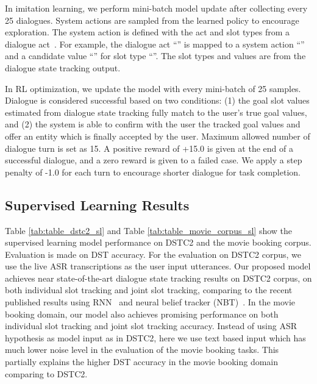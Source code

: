 \documentclass[11pt,a4paper]{article}
\begin{document}
    In imitation learning, we perform mini-batch model update after collecting every 25 dialogues. System actions are sampled from the learned policy to encourage exploration. The system action is defined with the act and slot types from a dialogue act~\cite{henderson2013dialog}. For example, the dialogue act ``'' is mapped to a system action ``'' and a candidate value ``'' for slot type ``''. The slot types and values are from the dialogue state tracking output.
    
    In RL optimization, we update the model with every mini-batch of 25 samples. Dialogue is considered successful based on two conditions: (1) the goal slot values estimated from dialogue state tracking fully match to the user's true goal values, and (2) the system is able to confirm with the user the tracked goal values and offer an entity which is finally accepted by the user.  Maximum allowed number of dialogue turn is set as 15. A positive reward of +15.0 is given at the end of a successful dialogue, and a zero reward is given to a failed case. We apply a step penalty of -1.0 for each turn to encourage shorter dialogue for task completion. 

\subsection{Supervised Learning Results}
    Table \ref{tab:table_dstc2_sl} and Table \ref{tab:table_movie_corpus_sl} show the supervised learning model performance on DSTC2 and the movie booking corpus. Evaluation is made on DST accuracy. For the evaluation on DSTC2 corpus, we use the live ASR transcriptions as the user input utterances. Our proposed model achieves near state-of-the-art dialogue state tracking results on DSTC2 corpus, on both individual slot tracking and joint slot tracking, comparing to the recent published results using RNN~\cite{henderson2014robust} and neural belief tracker (NBT)~\cite{mrkvsic2016neural}. In the movie booking domain, our model also achieves promising performance on both individual slot tracking and joint slot tracking accuracy. Instead of using ASR hypothesis as model input as in DSTC2, here we use text based input which has much lower noise level in the evaluation of the movie booking tasks. This partially explains the higher DST accuracy in the movie booking domain comparing to DSTC2.
\end{document}
